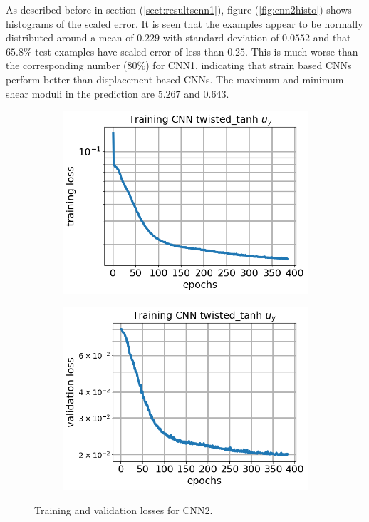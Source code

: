 \documentclass[10pt]{article}
\newcommand{\nhghalfwidth}{0.48\linewidth}
\newcommand{\nhgtotalheight}{4cm}
\begin{document}
As described before in section (\ref{sect:resultscnn1}), figure (\ref{fig:cnn2histo}) shows histograms of the scaled error. It is seen that the examples appear to be normally distributed around a mean of ${0.229}$ with standard deviation of $0.0552$ and that $65.8\%$ test examples have scaled error of less than $0.25$. This is much worse than the corresponding number ($80\%$) for CNN1, indicating that strain based CNNs perform better than displacement based CNNs. The maximum and minimum shear moduli in the prediction are $5.267$ and $0.643$. 
\begin{figure}[!h]
  \centering
  \begin{subfigure}[c]{\nhghalfwidth}
    \centering
    \includegraphics[totalheight=\nhgtotalheight]{Figures/Results2/loss.png}
  \end{subfigure}
%  
  \begin{subfigure}[c]{\nhghalfwidth}
    \centering
    \includegraphics[totalheight=\nhgtotalheight]{Figures/Results2/val_loss.png}
  \end{subfigure}
  \caption{\label{fig:cnn2losses} Training and validation losses for CNN2.}
\end{figure}
\end{document}
